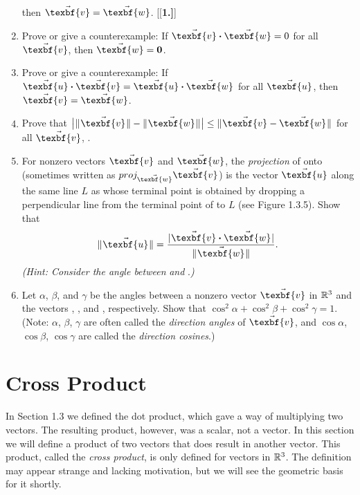 \begin{enumerate}[\bfseries 1.]
  then $\vec{\texbf{v}} =\vec{\texbf{w}}$.
[{[\bfseries 1.]}]
 \item Prove or give a counterexample: If $\Dotprod{\vec{\texbf{v}}}{\vec{\texbf{w}}} = 0$ for all $\vec{\texbf{v}}$, then
  $\vec{\texbf{w}} =\textbf{0}$.
 \item Prove or give a counterexample: If $\Dotprod{\vec{\texbf{u}}}{\vec{\texbf{v}}} = \Dotprod{\vec{\texbf{u}}}{\vec{\texbf{w}}}$
  for all $\vec{\texbf{u}}$, then $\vec{\texbf{v}} =\vec{\texbf{w}}$.
 \item Prove that $\Abs{\norm{\vec{\texbf{v}}} - \norm{\vec{\texbf{w}}}} \le \norm{\vec{\texbf{v}} - \vec{\texbf{w}}}$ for all
  $\vec{\texbf{v}}$, .

 \piccaption[]{}
 \item For nonzero vectors $\vec{\texbf{v}}$ and $\vec{\texbf{w}}$, the \emph{projection} of  onto
   (sometimes written as $proj_{\vec{\texbf{w}}}\vec{\texbf{v}}$) is the vector $\vec{\texbf{u}}$ along the same line $L$ as
   whose terminal point is obtained by dropping a perpendicular line from the terminal point of 
  to $L$ (see Figure 1.3.5). Show that
  \begin{displaymath}
   \norm{\vec{\texbf{u}}} = \frac{\abs{\Dotprod{\vec{\texbf{v}}}{\vec{\texbf{w}}}}}{\norm{\vec{\texbf{w}}}}.
  \end{displaymath}
  \emph{(Hint: Consider the angle between}  \emph{and} .\emph{)}
 \item Let $\alpha$, $\beta$, and $\gamma$ be the angles between a nonzero vector $\vec{\texbf{v}}$ in $\mathbb{R}^{3}$ and the
  vectors \boldsymbol{\hat{\textbf{\i}}}, \boldsymbol{\hat{\textbf{\j}}}, and , respectively. Show that $\cos^2 \alpha + \cos^2 \beta +
  \cos^2 \gamma = 1$.\\
  (Note: $\alpha$, $\beta$, $\gamma$ are often called the \emph{direction angles} of $\vec{\texbf{v}}$,
  and $\cos \alpha$, $\cos \beta$, $\cos \gamma$ are called the \emph{direction cosines}.)
\end{enumerate}
\newpage
\section{Cross Product}
In Section 1.3 we defined the dot product, which gave a way of multiplying two vectors. The resulting product,
however, was a scalar, not a vector. In this section we will define a product of two vectors that does result in
another vector. This product, called the \emph{cross product}, is only defined for vectors
in $\mathbb{R}^{3}$. The definition may appear strange and lacking motivation, but we will see the geometric basis for
it shortly.

